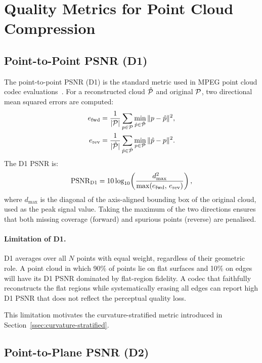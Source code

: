 \section{Quality Metrics for Point Cloud Compression}
\label{sec:metrics}

\subsection{Point-to-Point PSNR (D1)}
\label{ssec:d1-psnr}

The point-to-point PSNR (D1) is the standard metric used in MPEG point cloud
codec evaluations~\cite{tian2017geometric}.
For a reconstructed cloud $\hat{\mathcal{P}}$ and original $\mathcal{P}$, two directional
mean squared errors are computed:
\begin{align}
  e_{\text{fwd}} &= \frac{1}{|\mathcal{P}|}\sum_{p \in \mathcal{P}} \min_{\hat{p} \in \hat{\mathcal{P}}} \|p - \hat{p}\|^2, \\
  e_{\text{rev}} &= \frac{1}{|\hat{\mathcal{P}}|}\sum_{\hat{p} \in \hat{\mathcal{P}}} \min_{p \in \mathcal{P}} \|\hat{p} - p\|^2.
\end{align}
The D1 PSNR is:
\begin{equation}
  \mathrm{PSNR}_{\text{D1}} = 10\log_{10}\!\left(\frac{d_{\max}^2}{\max(e_{\text{fwd}},\, e_{\text{rev}})}\right),
\end{equation}
where $d_{\max}$ is the diagonal of the axis-aligned bounding box of the
original cloud, used as the peak signal value.
Taking the maximum of the two directions ensures that both missing coverage
(forward) and spurious points (reverse) are penalised.

\paragraph{Limitation of D1.}
D1 averages over all $N$ points with equal weight, regardless of their
geometric role.
A point cloud in which 90\% of points lie on flat surfaces and 10\% on edges
will have its D1 PSNR dominated by flat-region fidelity.
A codec that faithfully reconstructs the flat regions while systematically
erasing all edges can report high D1 PSNR that does not reflect the
perceptual quality loss.

This limitation motivates the curvature-stratified metric introduced in
Section~\ref{ssec:curvature-stratified}.

\subsection{Point-to-Plane PSNR (D2)}

